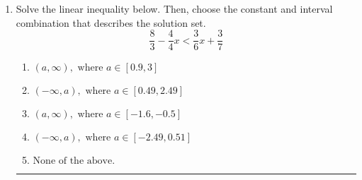 \documentclass[14pt]{extbook}
\newcommand{\litem}[1]{\item#1\hspace*{-1cm}\rule{\textwidth}{0.4pt}}
\begin{document}
\begin{enumerate}
{\begin{enumerate}[label=\Alph*.]
\end{enumerate} }
\litem{
Solve the linear inequality below. Then, choose the constant and interval combination that describes the solution set.\[ \frac{8}{3} - \frac{4}{4} x < \frac{3}{6} x + \frac{3}{7} \]\begin{enumerate}[label=\Alph*.]
\item \( (a, \infty), \text{ where } a \in [0.9, 3] \)
\item \( (-\infty, a), \text{ where } a \in [0.49, 2.49] \)
\item \( (a, \infty), \text{ where } a \in [-1.6, -0.5] \)
\item \( (-\infty, a), \text{ where } a \in [-2.49, 0.51] \)
\item \( \text{None of the above}. \)

\end{enumerate} }
\end{enumerate}
\end{document}
